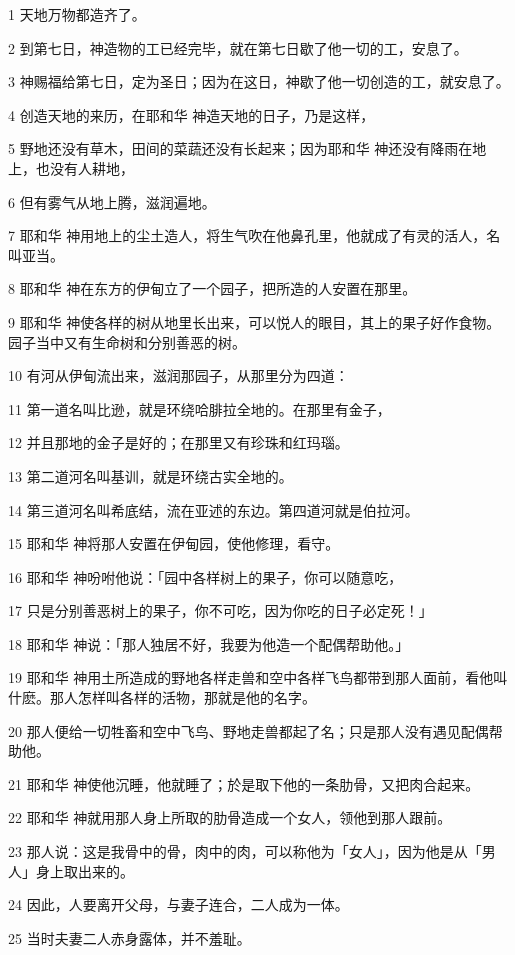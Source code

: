 \par 1 天地万物都造齐了。
\par 2 到第七日，神造物的工已经完毕，就在第七日歇了他一切的工，安息了。
\par 3 神赐福给第七日，定为圣日；因为在这日，神歇了他一切创造的工，就安息了。
\par 4 创造天地的来历，在耶和华 神造天地的日子，乃是这样，
\par 5 野地还没有草木，田间的菜蔬还没有长起来；因为耶和华 神还没有降雨在地上，也没有人耕地，
\par 6 但有雾气从地上腾，滋润遍地。
\par 7 耶和华 神用地上的尘土造人，将生气吹在他鼻孔里，他就成了有灵的活人，名叫亚当。
\par 8 耶和华 神在东方的伊甸立了一个园子，把所造的人安置在那里。
\par 9 耶和华 神使各样的树从地里长出来，可以悦人的眼目，其上的果子好作食物。园子当中又有生命树和分别善恶的树。
\par 10 有河从伊甸流出来，滋润那园子，从那里分为四道：
\par 11 第一道名叫比逊，就是环绕哈腓拉全地的。在那里有金子，
\par 12 并且那地的金子是好的；在那里又有珍珠和红玛瑙。
\par 13 第二道河名叫基训，就是环绕古实全地的。
\par 14 第三道河名叫希底结，流在亚述的东边。第四道河就是伯拉河。
\par 15 耶和华 神将那人安置在伊甸园，使他修理，看守。
\par 16 耶和华 神吩咐他说：「园中各样树上的果子，你可以随意吃，
\par 17 只是分别善恶树上的果子，你不可吃，因为你吃的日子必定死！」
\par 18 耶和华 神说：「那人独居不好，我要为他造一个配偶帮助他。」
\par 19 耶和华 神用土所造成的野地各样走兽和空中各样飞鸟都带到那人面前，看他叫什麽。那人怎样叫各样的活物，那就是他的名字。
\par 20 那人便给一切牲畜和空中飞鸟、野地走兽都起了名；只是那人没有遇见配偶帮助他。
\par 21 耶和华 神使他沉睡，他就睡了；於是取下他的一条肋骨，又把肉合起来。
\par 22 耶和华 神就用那人身上所取的肋骨造成一个女人，领他到那人跟前。
\par 23 那人说：这是我骨中的骨，肉中的肉，可以称他为「女人」，因为他是从「男人」身上取出来的。
\par 24 因此，人要离开父母，与妻子连合，二人成为一体。
\par 25 当时夫妻二人赤身露体，并不羞耻。


